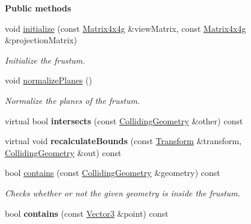 \begin{Indent}\textbf{ Public methods}\par
\begin{DoxyCompactItemize}
\item 
\mbox{\label{classrev_1_1_frustum_abd23e75e47531b32e24eab0ac326d697}} 
void \mbox{\hyperlink{classrev_1_1_frustum_abd23e75e47531b32e24eab0ac326d697}{initialize}} (const \mbox{\hyperlink{classrev_1_1_square_matrix}{Matrix4x4g}} \&view\+Matrix, const \mbox{\hyperlink{classrev_1_1_square_matrix}{Matrix4x4g}} \&projection\+Matrix)
\begin{DoxyCompactList}\small\item\em Initialize the frustum. \end{DoxyCompactList}\item 
\mbox{\label{classrev_1_1_frustum_a3d0de4ef3e49887222e191eeba21adf9}} 
void \mbox{\hyperlink{classrev_1_1_frustum_a3d0de4ef3e49887222e191eeba21adf9}{normalize\+Planes}} ()
\begin{DoxyCompactList}\small\item\em Normalize the planes of the frustum. \end{DoxyCompactList}\item 
\mbox{\label{classrev_1_1_frustum_abc4c5c87c95bce36ad2e208c2feb72f3}} 
virtual bool {\bfseries intersects} (const \mbox{\hyperlink{classrev_1_1_colliding_geometry}{Colliding\+Geometry}} \&other) const
\item 
\mbox{\label{classrev_1_1_frustum_acbe4e96f53a54bb47735670439b9ae0c}} 
virtual void {\bfseries recalculate\+Bounds} (const \mbox{\hyperlink{classrev_1_1_transform}{Transform}} \&transform, \mbox{\hyperlink{classrev_1_1_colliding_geometry}{Colliding\+Geometry}} \&out) const
\item 
\mbox{\label{classrev_1_1_frustum_abffdd5f3bc5b723c616830e48bd01128}} 
bool \mbox{\hyperlink{classrev_1_1_frustum_abffdd5f3bc5b723c616830e48bd01128}{contains}} (const \mbox{\hyperlink{classrev_1_1_colliding_geometry}{Colliding\+Geometry}} \&geometry) const
\begin{DoxyCompactList}\small\item\em Checks whether or not the given geometry is inside the frustum. \end{DoxyCompactList}\item 
\mbox{\label{classrev_1_1_frustum_a61813ac4cbc4bd9fcff29eee21736ece}} 
bool {\bfseries contains} (const \mbox{\hyperlink{classrev_1_1_vector}{Vector3}} \&point) const
\end{DoxyCompactItemize}
\end{Indent}

